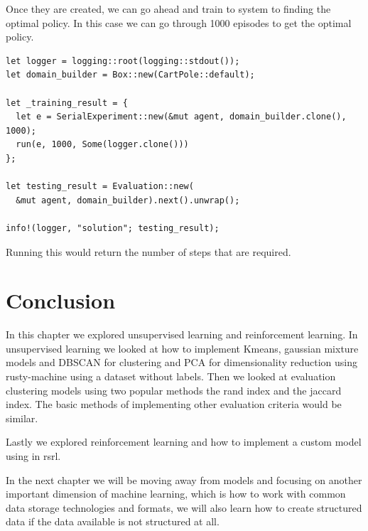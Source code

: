 \documentclass{book}
\begin{document}
Once they are created, we can go ahead and train to system to finding the optimal policy. In this case we can go through 1000 episodes to get the optimal policy.

\begin{lstlisting}[caption={chapter3\\/rsrl\_custom\\/src\\/main\\.rs},basicstyle=\small]
let logger = logging::root(logging::stdout());
let domain_builder = Box::new(CartPole::default);

let _training_result = {
  let e = SerialExperiment::new(&mut agent, domain_builder.clone(), 1000);
  run(e, 1000, Some(logger.clone()))
};

let testing_result = Evaluation::new(
  &mut agent, domain_builder).next().unwrap();

info!(logger, "solution"; testing_result);
\end{lstlisting}

Running this would return the number of steps that are required.

\label{sec:Reinforcement learning}


\section{Conclusion}%
In this chapter we explored unsupervised learning and reinforcement learning. In unsupervised learning we looked at how to implement Kmeans, gaussian mixture models and DBSCAN for clustering and PCA for dimensionality reduction using rusty-machine using a dataset without labels. Then we looked at evaluation clustering models using two popular methods the rand index and the jaccard index. The basic methods of implementing other evaluation criteria would be similar.

Lastly we explored reinforcement learning and how to implement a custom model using in rsrl.

In the next chapter we will be moving away from models and focusing on another important dimension of machine learning, which is how to work with common data storage technologies and formats, we will also learn how to create structured data if the data available is not structured at all.
\label{sec:conclusion}

\printbibliography
\nocite{*}
\end{document}
